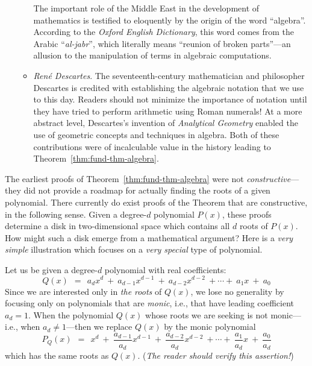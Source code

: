 \begin{itemize}
\begin{itemize}
{\begin{minipage}{0.88\textwidth}
\smallskip

The important role of the Middle East in the development of mathematics is testified to eloquently by the origin of the word ``algebra''.  According to the {\it Oxford English Dictionary}, this word comes from the Arabic ``{\it al-jabr}'', which literally means ``reunion of broken parts''---an allusion to the manipulation of terms in algebraic computations.
\end{minipage}  }

\bigskip

   \medskip\item
{\it Ren\'{e} Descartes}.  The seventeenth-century mathematician and philosopher Descartes is credited with establishing the algebraic notation that we use to this day.  Readers should not minimize the importance of notation until they have tried to perform arithmetic using Roman numerals!  At a more abstract level, Descartes's invention of {\em Analytical Geometry} enabled the use of geometric concepts and techniques in algebra.  Both of these contributions were of incalculable value in the history leading to Theorem~\ref{thm:fund-thm-algebra}.
   \end{itemize}
\end{itemize}

\medskip

The earliest proofs of Theorem~\ref{thm:fund-thm-algebra} were not {\em constructive}---they did not provide a roadmap for actually finding the roots of a given polynomial.  There currently do exist proofs of the Theorem that are constructive, in the following sense.  Given a degree-$d$ polynomial $P(x)$, these proofs determine a disk in two-dimensional space which contains all $d$ roots of $P(x)$.  How might such a disk emerge from a mathematical argument?  Here is a {\em very simple} illustration which focuses on a {\em very special} type of polynomial.

\smallskip

Let us be given a degree-$d$ polynomial with real coefficients:
\[ Q(x) \ \ = \ \ a_d x^d \ + \ a_{d-1} x^{d-1} \ + \ a_{d-2} x^{d-2} \ + \cdots + \ a_1 x \ + \ a_0
\]
Since we are interested only in {\em the roots} of $Q(x)$, we lose no generality by focusing only on polynomials that are {\em monic}, i.e., that have leading coefficient $a_d = 1$.  When the polynomial $Q(x)$ whose roots we are seeking is not monic---i.e., when $a_d \neq 1$---then we replace $Q(x)$ by the monic polynomial
\[ P_Q(x) \ \ = \ \ x^d \ + \ \frac{a_{d-1}}{a_d} x^{d-1} \ + \ \frac{a_{d-2}}{a_d} x^{d-2}
\ + \cdots + \ \frac{a_1}{a_d} x \ + \ \frac{a_0}{a_d}
\]
which has the same roots as $Q(x)$.  ({\em The reader should verify this assertion!})  

